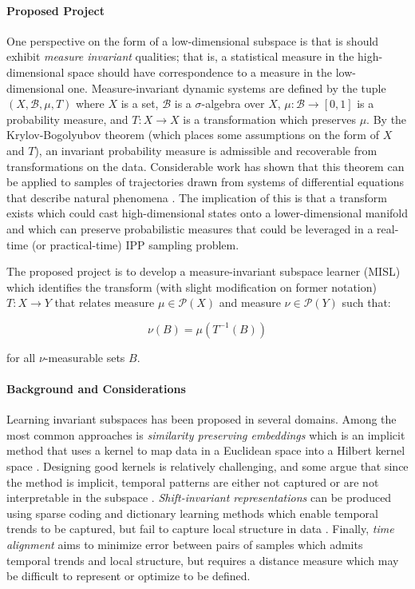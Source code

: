 \paragraph{Proposed Project} 
One perspective on the form of a low-dimensional subspace is that is should exhibit \emph{measure invariant} qualities; that is, a statistical measure in the high-dimensional space should have correspondence to a measure in the low-dimensional one.
Measure-invariant dynamic systems are defined by the tuple $(X, \mathcal{B}, \mu, T)$ where $X$ is a set, $\mathcal{B}$ is a $\sigma$-algebra over $X$, $\mu: \mathcal{B} \longrightarrow [0,1]$ is a probability measure, and $T: X \longrightarrow X$ is a transformation which preserves $\mu$.
By the Krylov-Bogolyubov theorem \autocite{kryloff1937theorie} (which places some assumptions on the form of $X$ and $T$), an invariant probability measure is admissible and recoverable from transformations on the data.
Considerable work has shown that this theorem can be applied to samples of trajectories drawn from systems of differential equations that describe natural phenomena \autocite{stannat2011stochastic,touze2021model,vizzaccaro2022high}.
The implication of this is that a transform exists which could cast high-dimensional states onto a lower-dimensional manifold and which can preserve probabilistic measures that could be leveraged in a real-time (or practical-time) IPP sampling problem.

The proposed project is to develop a measure-invariant subspace learner (MISL) which identifies the transform (with slight modification on former notation) $T: X\rightarrow Y$ that relates measure $\mu \in \mathcal{P}(X)$ and measure $\nu \in \mathcal{P}(Y)$ such that:

\begin{equation*}
    \nu(B) = \mu(T^{-1}(B))
\end{equation*}

\noindent for all $\nu$-measurable sets $B$.

\paragraph{Background and Considerations}
Learning invariant subspaces has been proposed in several domains.
Among the most common approaches is \emph{similarity preserving embeddings} which is an implicit method that uses a kernel to map data in a Euclidean space into a Hilbert kernel space \autocite{scholkopf1997kernel}.
Designing good kernels is relatively challenging, and some argue that since the method is implicit, temporal patterns are either not captured or are not interpretable in the subspace \autocite{deng2020invariant}.
\emph{Shift-invariant representations} can be produced using sparse coding and dictionary learning methods which enable temporal trends to be captured, but fail to capture local structure in data \autocite{lewicki1999coding}.
Finally, \emph{time alignment} \autocite{deng2020invariant} aims to minimize error between pairs of samples which admits temporal trends and local structure, but requires a distance measure which may be difficult to represent or optimize to be defined.

